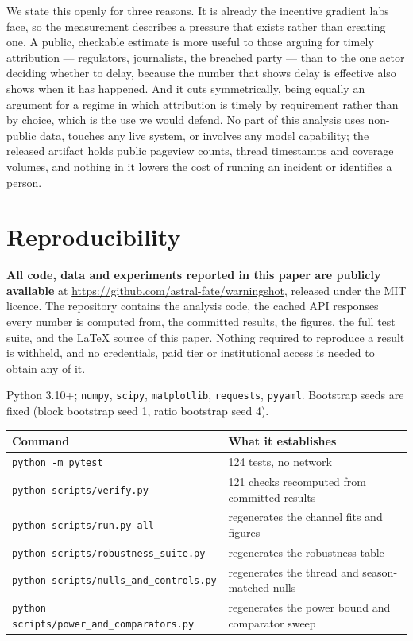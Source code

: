 \documentclass[11pt,a4paper]{article}
\begin{document}
We state this openly for three reasons. It is already the incentive gradient labs
face, so the measurement describes a pressure that exists rather than creating
one. A public, checkable estimate is more useful to those arguing for timely
attribution --- regulators, journalists, the breached party --- than to the one
actor deciding whether to delay, because the number that shows delay is
effective also shows when it has happened. And it cuts symmetrically, being
equally an argument for a regime in which attribution is timely by requirement
rather than by choice, which is the use we would defend. No part of this
analysis uses non-public data, touches any live system, or involves any model
capability; the released artifact holds public pageview counts, thread
timestamps and coverage volumes, and nothing in it lowers the cost of running an
incident or identifies a person.




\appendix

\section{Reproducibility}
\label{sec:repro}

\textbf{All code, data and experiments reported in this paper are publicly
available} at \url{https://github.com/astral-fate/warningshot}, released under the MIT licence. The repository contains
the analysis code, the cached API responses every number is computed from, the
committed results, the figures, the full test suite, and the \LaTeX{} source of
this paper. Nothing required to reproduce a result is withheld, and no
credentials, paid tier or institutional access is needed to obtain any of it.

Python 3.10+; \texttt{numpy}, \texttt{scipy}, \texttt{matplotlib},
\texttt{requests}, \texttt{pyyaml}. Bootstrap seeds are fixed (block bootstrap
seed 1, ratio bootstrap seed 4).

\begin{center}
\small
\begin{tabular}{ll}
\toprule
Command & What it establishes \\\midrule
\texttt{python -m pytest} & 124 tests, no network \\
\texttt{python scripts/verify.py} & 121 checks recomputed from committed results \\
\texttt{python scripts/run.py all} & regenerates the channel fits and figures \\
\texttt{python scripts/robustness\_suite.py} & regenerates the robustness table \\
\texttt{python scripts/nulls\_and\_controls.py} & regenerates the thread and season-matched nulls \\
\texttt{python scripts/power\_and\_comparators.py} & regenerates the power bound and comparator sweep \\
\bottomrule
\end{tabular}
\end{center}
\end{document}
